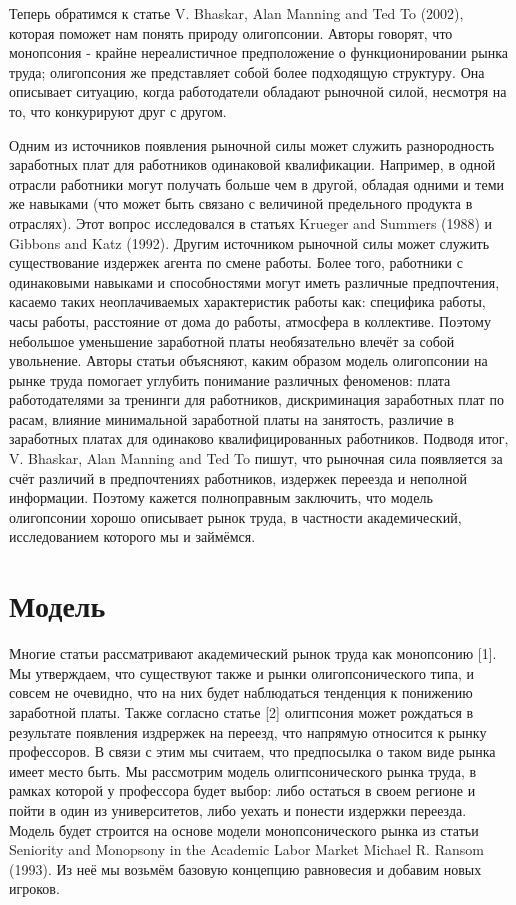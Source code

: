\documentclass[a4paper, 12pt]{article}
\theoremstyle{definition}
\theoremstyle{plain}
\begin{document}
	Теперь обратимся к статье V. Bhaskar, Alan Manning and Ted To (2002), которая поможет нам понять природу олигопсонии. Авторы говорят,  что монопсония - крайне нереалистичное предположение о функционировании рынка труда; олигопсония же представляет собой более подходящую структуру. Она описывает ситуацию, когда работодатели обладают рыночной силой, несмотря на то, что конкурируют друг с другом. 

	Одним из источников появления рыночной силы может служить разнородность заработных плат для работников одинаковой квалификации. Например, в одной отрасли работники могут получать больше чем в другой, обладая одними и теми же навыками (что может быть связано с величиной предельного продукта в отраслях). Этот вопрос исследовался в статьях Krueger and Summers (1988) и Gibbons and Katz (1992).
Другим источником рыночной силы может служить существование издержек агента по смене работы. Более того, работники с одинаковыми навыками и способностями могут иметь различные предпочтения, касаемо таких неоплачиваемых характеристик работы как: специфика работы, часы работы, расстояние от дома до работы, атмосфера в коллективе. Поэтому небольшое уменьшение заработной платы необязательно влечёт за собой увольнение.
Авторы статьи объясняют, каким образом модель олигопсонии на рынке труда помогает углубить понимание различных феноменов: плата работодателями за тренинги для работников, дискриминация заработных плат по расам, влияние минимальной заработной платы на занятость, различие в заработных платах для одинаково квалифицированных работников. Подводя итог, V. Bhaskar, Alan Manning and Ted To пишут, что рыночная сила появляется за счёт различий в предпочтениях работников, издержек переезда и неполной информации. Поэтому кажется полноправным заключить, что модель олигопсонии хорошо описывает рынок труда, в частности академический, исследованием которого мы и займёмся.

\section{Модель}

Многие статьи рассматривают академический рынок труда как монопсонию [1]. Мы утверждаем, что существуют также и рынки олигопсонического типа, и совсем не очевидно, что на них будет наблюдаться тенденция к понижению заработной платы. Также согласно статье [2] олигпсония может рождаться в результате появления издрержек на переезд, что напрямую относится к рынку профессоров. В связи с этим мы считаем, что предпосылка о таком виде рынка имеет место быть.  Мы рассмотрим модель олигпсонического рынка труда, в рамках которой у профессора будет выбор: либо остаться в своем регионе и пойти в один из университетов, либо уехать и понести издержки переезда. Модель будет строится на основе модели монопсонического рынка из статьи Seniority and Monopsony in the Academic Labor Market Michael R. Ransom (1993). Из неё мы возьмём базовую концепцию равновесия и добавим новых игроков. 
\end{document}
